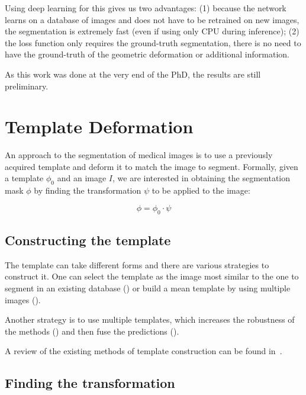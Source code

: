 Using deep learning for this gives us two advantages: (1) because the network learns on a database of images and does not have to be retrained on new images, the segmentation is extremely fast (even if using only CPU during inference); (2) the loss function only requires the ground-truth segmentation, there is no need to have the ground-truth of the geometric deformation or additional information.

As this work was done at the very end of the PhD, the results are still preliminary.

\section{Template Deformation}
\label{sec:seg_biblio}

An approach to the segmentation of medical images is to use a previously acquired template and deform it to match the image to segment. Formally, given a template $\phi_0$ and an image $I$, we are interested in obtaining the segmentation mask $\phi$ by finding the transformation $\psi$ to be applied to the image:

\begin{equation}
    \phi = \phi_0 \cdot \psi %
\end{equation}

\subsection{Constructing the template}

The template can take different forms and there are various strategies to construct it. One can select the template as the image most similar to the one to segment in an existing database (\textcite{commowick2007MICCAI}) or build a mean template by using multiple images (\textcite{joshi2004}).

Another strategy is to use multiple templates, which increases the robustness of the methods (\textcite{heckemann2006}) and then fuse the predictions (\textcite{warfield2004}). 

A review of the existing methods of template construction can be found in~\textcite{cabezas2011}.

\subsection{Finding the transformation}

